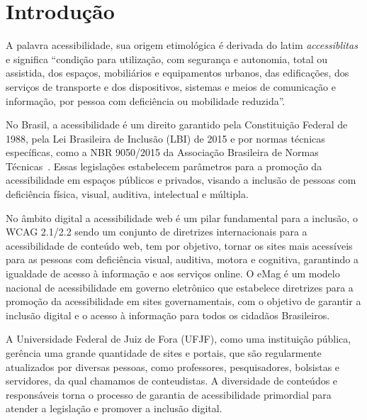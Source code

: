 \documentclass[
	article,			%
	12pt,				%
	oneside,			%
	a4paper,			%
	section=TITLE,		%
	subsection=TITLE,	%
	english,			%
	brazil,				%
	sumario=tradicional
	]{abntex2}
\begin{document}
\textual

\section{Introdução}

A palavra acessibilidade, sua origem etimológica é derivada do latim \textit{accessiblitas}
e significa ``condição para utilização, com segurança e autonomia,
total ou assistida, dos espaços, mobiliários e equipamentos urbanos, das
edificações, dos serviços de transporte e dos dispositivos, sistemas e meios de
comunicação e informação, por pessoa com deficiência ou mobilidade reduzida''\cite{CD}.

No Brasil, a acessibilidade é um direito garantido pela Constituição
Federal de 1988, pela Lei Brasileira de Inclusão (LBI) de 2015 \cite{LBI}
e por normas técnicas específicas, como a NBR 9050/2015 da Associação
Brasileira de Normas Técnicas~\cite{ABNT}. Essas legislações estabelecem
parâmetros para a promoção da acessibilidade em espaços públicos e privados,
visando a inclusão de pessoas com deficiência física, visual, auditiva,
intelectual e múltipla.

No âmbito digital a acessibilidade web é um pilar fundamental para a
inclusão, o WCAG 2.1/2.2 \cite{wcag22} sendo um conjunto de diretrizes
internacionais para a acessibilidade de conteúdo web, tem por objetivo,
tornar os sites mais acessíveis para as pessoas com deficiência visual, auditiva,
motora e cognitiva, garantindo a igualdade de acesso à informação e aos
serviços online. O eMag é um modelo nacional de acessibilidade em governo
eletrônico que estabelece diretrizes para a promoção da acessibilidade em
sites governamentais, com o objetivo de garantir a inclusão digital e o acesso
à informação para todos os cidadãos Brasileiros.

A Universidade Federal de Juiz de Fora (UFJF), como uma instituição pública,
gerência uma grande quantidade de sites e portais, que são regularmente
atualizados por diversas pessoas, como professores, pesquisadores, bolsistas e
servidores, da qual chamamos de conteudistas. A diversidade de conteúdos e
responsáveis torna o processo de garantia de acessibilidade primordial para
atender a legislação e promover a inclusão digital.
\end{document}
